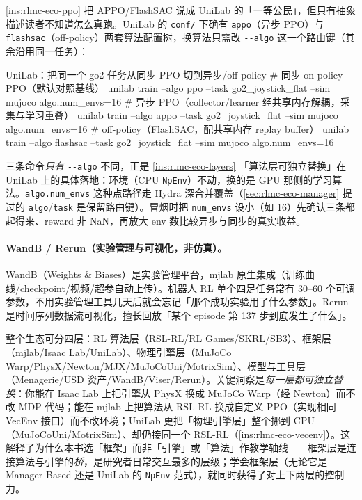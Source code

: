 \begin{note}
\cref{ins:rlmc-eco-ppo} 把 APPO/FlashSAC 说成 UniLab 的「一等公民」，但只有抽象描述读者不知道怎么真跑。UniLab 的 \verb|conf/| 下确有 \verb|appo|（异步 PPO）与 \verb|flashsac|（off-policy）两套算法配置树，换算法只需改 \verb|--algo| 这一个路由键（其余沿用同一任务）：
\begin{codebox}[bash]{UniLab：把同一个 go2 任务从同步 PPO 切到异步/off-policy}
# 同步 on-policy PPO（默认对照基线）
unilab train --algo ppo     --task go2_joystick_flat --sim mujoco algo.num_envs=16
# 异步 PPO（collector/learner 经共享内存解耦，采集与学习重叠）
unilab train --algo appo    --task go2_joystick_flat --sim mujoco algo.num_envs=16
# off-policy（FlashSAC，配共享内存 replay buffer）
unilab train --algo flashsac --task go2_joystick_flat --sim mujoco algo.num_envs=16
\end{codebox}
三条命令\emph{只有} \verb|--algo| 不同，正是 \cref{ins:rlmc-eco-layers} 「算法层可独立替换」在 UniLab 上的具体落地：环境（CPU \verb|NpEnv|）不动，换的是 GPU 那侧的学习算法。\verb|algo.num_envs| 这种点路径走 Hydra 深合并覆盖（\cref{sec:rlmc-eco-manager} 提过的 \verb|algo|/\verb|task| 是保留路由键）。冒烟时把 \verb|num_envs| 设小（如 16）先确认三条都起得来、reward 非 NaN，再放大 env 数比较异步与同步的真实收益。
\end{note}

\paragraph{WandB / Rerun（实验管理与可视化，非仿真）。}WandB（Weights \& Biases）是实验管理平台，mjlab 原生集成（训练曲线/checkpoint/视频/超参自动上传）。机器人 RL 单个四足任务常有 $30$--$60$ 个可调参数，不用实验管理工具几天后就会忘记「那个成功实验用了什么参数」。Rerun 是时间序列数据流可视化，擅长回放「某个 episode 第 137 步到底发生了什么」。

\begin{insight}[框架-引擎-工具是可独立替换的分层]\label{ins:rlmc-eco-layers}
整个生态可分四层：RL 算法层（RSL-RL/RL Games/SKRL/SB3）、框架层（mjlab/Isaac Lab/UniLab）、物理引擎层（MuJoCo Warp/PhysX/Newton/MJX/MuJoCoUni/MotrixSim）、模型与工具层（Menagerie/USD 资产/WandB/Viser/Rerun）。关键洞察是\emph{每一层都可独立替换}：你能在 Isaac Lab 上把引擎从 PhysX 换成 MuJoCo Warp（经 Newton）而不改 MDP 代码；能在 mjlab 上把算法从 RSL-RL 换成自定义 PPO（实现相同 VecEnv 接口）而不改环境；UniLab 更把「物理引擎层」整个挪到 CPU（MuJoCoUni/MotrixSim）、却仍接同一个 RSL-RL（\cref{ins:rlmc-eco-vecenv}）。这解释了为什么本书选「框架」而非「引擎」或「算法」作教学轴线——框架层是连接算法与引擎的\emph{桥}，是研究者日常交互最多的层级；学会框架层（无论它是 Manager-Based 还是 UniLab 的 \verb|NpEnv| 范式），就同时获得了对上下两层的控制力。
\end{insight}

